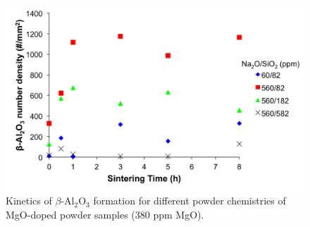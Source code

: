 \newpage
\begin{figure}[H]
	\centering
	\includegraphics[width=\textwidth]{Chapter-5/Figures/Figure4.png}
	\caption{Kinetics of $\beta$-Al$_{2}$O$_{3}$ formation for different powder chemistries of MgO-doped powder samples (380 ppm MgO).}
	\label{Ch5-figure:Figure4}
\end{figure}

